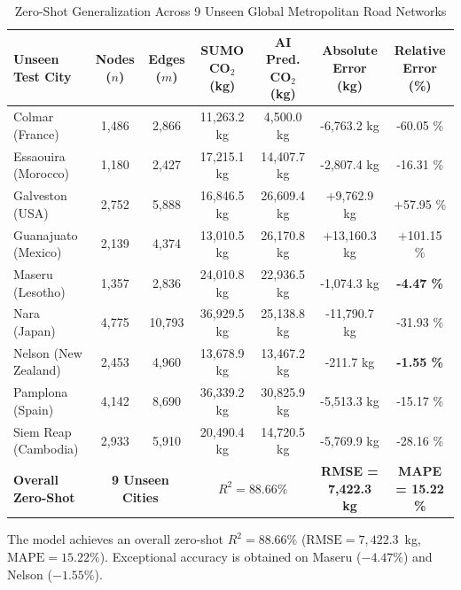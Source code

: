 \documentclass[journal]{IEEEtran}
\begin{document}
\begin{table}[htbp]
\caption{Zero-Shot Generalization Across 9 Unseen Global Metropolitan Road Networks}
\label{tab:zero_shot}
\centering
\begin{tabular}{lcccccc}
\toprule
Unseen Test City & Nodes ($n$) & Edges ($m$) & SUMO CO$_2$ (kg) & AI Pred. CO$_2$ (kg) & Absolute Error (kg) & Relative Error (\%) \\
\midrule
Colmar (France) & 1,486 & 2,866 & 11,263.2 kg & 4,500.0 kg & -6,763.2 kg & -60.05 \% \\
Essaouira (Morocco) & 1,180 & 2,427 & 17,215.1 kg & 14,407.7 kg & -2,807.4 kg & -16.31 \% \\
Galveston (USA) & 2,752 & 5,888 & 16,846.5 kg & 26,609.4 kg & +9,762.9 kg & +57.95 \% \\
Guanajuato (Mexico) & 2,139 & 4,374 & 13,010.5 kg & 26,170.8 kg & +13,160.3 kg & +101.15 \% \\
Maseru (Lesotho) & 1,357 & 2,836 & 24,010.8 kg & 22,936.5 kg & -1,074.3 kg & \textbf{-4.47 \%} \\
Nara (Japan) & 4,775 & 10,793 & 36,929.5 kg & 25,138.8 kg & -11,790.7 kg & -31.93 \% \\
Nelson (New Zealand) & 2,453 & 4,960 & 13,678.9 kg & 13,467.2 kg & -211.7 kg & \textbf{-1.55 \%} \\
Pamplona (Spain) & 4,142 & 8,690 & 36,339.2 kg & 30,825.9 kg & -5,513.3 kg & -15.17 \% \\
Siem Reap (Cambodia) & 2,933 & 5,910 & 20,490.4 kg & 14,720.5 kg & -5,769.9 kg & -28.16 \% \\
\midrule
\textbf{Overall Zero-Shot} & \multicolumn{2}{c}{\textbf{9 Unseen Cities}} & \multicolumn{2}{c}{\textbf{$R^2 = \mathbf{88.66 \%}$}} & \textbf{RMSE = 7,422.3 kg} & \textbf{MAPE = 15.22 \%} \\
\bottomrule
\end{tabular}
\end{table}

The model achieves an overall zero-shot $R^2 = 88.66\%$ ($\text{RMSE} = 7,422.3$~kg, $\text{MAPE} = 15.22\%$). Exceptional accuracy is obtained on Maseru ($-4.47\%$) and Nelson ($-1.55\%$).
\end{document}
